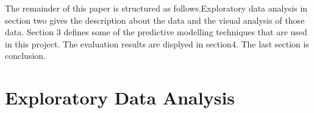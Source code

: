 


The remainder of this paper is structured as follows.Exploratory data analysis in section two gives the description about the data and the visual analysis of those data. Section 3 defines some of the predictive modelling techniques that are used in this project. The evaluation results are displyed in section4. The last section is conclusion.




\section{Exploratory Data Analysis} \label{sec-eda}

